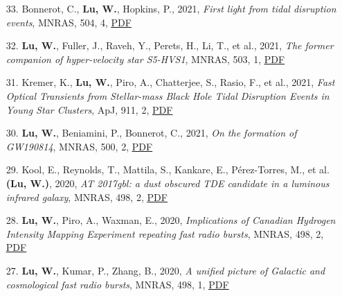\begin{itemize}[leftmargin=0.65cm]
\vspace{-0.1cm}
\item[33.]{Bonnerot, C., {\bf Lu, W.}, Hopkins, P., 2021, {\it First light from tidal disruption events}, MNRAS, 504, 4, \href{https://ui.adsabs.harvard.edu/abs/2021MNRAS.504.4885B}{\underline{PDF}}}

\vspace{-0.1cm}
\item[32.]{{\bf Lu, W.}, Fuller, J., Raveh, Y., Perets, H., Li, T., et al., 2021, {\it The former companion of hyper-velocity star S5-HVS1}, MNRAS, 503, 1, \href{https://ui.adsabs.harvard.edu/abs/2021MNRAS.503..603L}{\underline{PDF}}}

\vspace{-0.1cm}
\item[31.]{Kremer, K., {\bf Lu, W.}, Piro, A., Chatterjee, S., Rasio, F., et al., 2021, {\it Fast Optical Transients from Stellar-mass Black Hole Tidal Disruption Events in Young Star Clusters}, ApJ, 911, 2, \href{https://ui.adsabs.harvard.edu/abs/2021ApJ...911..104K}{\underline{PDF}}}

\vspace{-0.1cm}
\item[30.]{{\bf Lu, W.}, Beniamini, P., Bonnerot, C., 2021, {\it On the formation of GW190814}, MNRAS, 500, 2, \href{https://ui.adsabs.harvard.edu/abs/2021MNRAS.500.1817L}{\underline{PDF}}}

\vspace{-0.1cm}
\item[29.]{Kool, E., Reynolds, T., Mattila, S., Kankare, E., P{\'e}rez-Torres, M., et al. {\bf (Lu, W.)}, 2020, {\it AT 2017gbl: a dust obscured TDE candidate in a luminous infrared galaxy}, MNRAS, 498, 2, \href{https://ui.adsabs.harvard.edu/abs/2020MNRAS.498.2167K}{\underline{PDF}}}

\vspace{-0.1cm}
\item[28.]{{\bf Lu, W.}, Piro, A., Waxman, E., 2020, {\it Implications of Canadian Hydrogen Intensity Mapping Experiment repeating fast radio bursts}, MNRAS, 498, 2, \href{https://ui.adsabs.harvard.edu/abs/2020MNRAS.498.1973L}{\underline{PDF}}}

\vspace{-0.1cm}
\item[27.]{{\bf Lu, W.}, Kumar, P., Zhang, B., 2020, {\it A unified picture of Galactic and cosmological fast radio bursts}, MNRAS, 498, 1, \href{https://ui.adsabs.harvard.edu/abs/2020MNRAS.498.1397L}{\underline{PDF}}}


\end{itemize}

